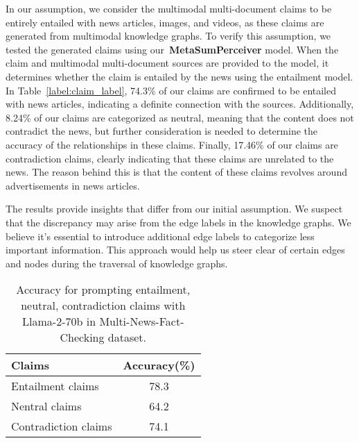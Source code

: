 In our assumption, we consider the multimodal multi-document claims to be entirely entailed with news articles, images, and videos, as these claims are generated from multimodal knowledge graphs. To verify this assumption, we tested the generated claims using our~\textbf{MetaSumPerceiver} model. When the claim and multimodal multi-document sources are provided to the model, it determines whether the claim is entailed by the news using the entailment model. In Table~\ref{label:claim_label}, 74.3\% of our claims are confirmed to be entailed with news articles, indicating a definite connection with the sources. Additionally, 8.24\% of our claims are categorized as neutral, meaning that the content does not contradict the news, but further consideration is needed to determine the accuracy of the relationships in these claims. Finally, 17.46\% of our claims are contradiction claims, clearly indicating that these claims are unrelated to the news. The reason behind this is that the content of these claims revolves around advertisements in news articles.

The results provide insights that differ from our initial assumption. We suspect that the discrepancy may arise from the edge labels in the knowledge graphs. We believe it's essential to introduce additional edge labels to categorize less important information. This approach would help us steer clear of certain edges and nodes during the traversal of knowledge graphs.

\begin{table}[h]\Large
\centering
\caption{Accuracy for prompting entailment, neutral, contradiction claims with Llama-2-70b in Multi-News-Fact-Checking dataset.}
\begin{tabular}{l|c}
\hline
\textbf{Claims}      & \textbf{Accuracy(\%)} \\ \hline
Entailment claims    & 78.3          \\
Nentral claims       & 64.2          \\
Contradiction claims & 74.1          \\ \hline
\end{tabular}
\label{label:prompt_accuracy}
\end{table}